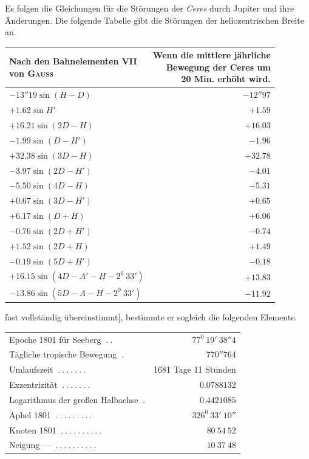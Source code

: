 Es folgen die Gleichungen für die Störungen der \textit{Ceres} durch Jupiter und ihre Änderungen.
%
Die folgende Tabelle gibt die Störungen der heliozentrischen Breite an.
\begin{center}
\begingroup\small
\begin{tabular}{l|r}
\shortstack{Nach den Bahnelementen VII\\von \textsc{Gauß}}&\shortstack{Wenn die mittlere jährliche\\Bewegung der Ceres um\\20 Min. erhöht wird.}\\\hline
$-13''19\sin(H-D)$&$-12''97$\\
$+1.62\sin H'$&$+1.59$\\[3pt]
$+16.21\sin(2D-H)$&$+16.03$\\
$-1.99\sin(D-H')$&$-1.96$\\[3pt]
$+32.38\sin(3D-H)$&$+32.78$\\
$-3.97\sin(2D-H')$&$-4.01$\\[3pt]
$-5.50\sin(4D-H)$&$-5.31$\\
$+0.67\sin(3D-H')$&$+0.65$\\[3pt]
$+6.17\sin(D+H)$&$+6.06$\\
$-0.76\sin(2D+H')$&$-0.74$\\[3pt]
$+1.52\sin(2D+H)$&$+1.49$\\
$-0.19\sin(5D+H')$&$-0.18$\\[3pt]
$+16.15\sin(4D-A'-H-2^0\ 33')$&$+13.83$\\
$-13.86\sin(5D-A-H-2^0\ 33')$&$-11.92$
\end{tabular}\endgroup
\end{center}
fast vollständig übereinstimmt], bestimmte er sogleich die folgenden Elemente.
\begin{center}
\begingroup\small\setlength{\tabcolsep}{3pt}
\begin{tabular}{l r}
Epoche 1801 für Seeberg $\ .\ .$&$77^0\ 19'\ 38''4$\\
Tägliche tropische Bewegung $\ .$&$770''764$\\
Umlaufszeit $\ .\ .\ .\ .\ .\ .\ .$&1681 Tage 11 Stunden\\
Exzentrizität $\ .\ .\ .\ .\ .\ .\ .$&$0.0788132$\\[3pt]
Logarithmus der großen Halbachse $\ .$&$0.4421085$\\
Aphel 1801 $\ .\ .\ .\ .\ .\ .\ .\ .\ .$&$326^0\ 33'\ 10''$\\
Knoten 1801 $\ .\ .\ .\ .\ .\ .\ .\ .\ .\ .$&$80\ 54\ 52$\\
Neigung — $\ .\ .\ .\ .\ .\ .\ .\ .\ .\ .$&$10\ 37\ 48$
\end{tabular}\endgroup
\end{center}

